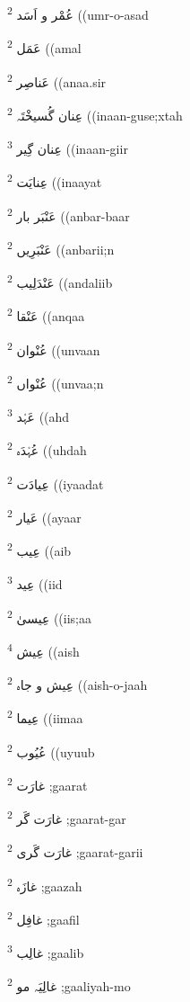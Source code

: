 \documentclass[12pt]{article}
\begin{document}
\begin{multicols}{5}
{\ur عُمْر و اَسَد}   \textsuperscript{2} ((umr-o-asad

{\ur عَمَل}   \textsuperscript{2} ((amal

{\ur عَناصِر}   \textsuperscript{2} ((anaa.sir

{\ur عِنان گُسیخْتَہ}   \textsuperscript{2} ((inaan-guse;xtah

{\ur عِنان گِیر}   \textsuperscript{3} ((inaan-giir

{\ur عِنایَت}   \textsuperscript{2} ((inaayat

{\ur عَنْبَر بار}   \textsuperscript{2} ((anbar-baar

{\ur عَنْبَرِیں}   \textsuperscript{2} ((anbarii;n

{\ur عَنْدَلِیب}   \textsuperscript{2} ((andaliib

{\ur عَنْقا}   \textsuperscript{2} ((anqaa

{\ur عُنْوان}   \textsuperscript{2} ((unvaan

{\ur عُنْواں}   \textsuperscript{2} ((unvaa;n

{\ur عَہْد}   \textsuperscript{3} ((ahd

{\ur عُہْدَہ}   \textsuperscript{2} ((uhdah

{\ur عِیادَت}   \textsuperscript{2} ((iyaadat

{\ur عَیار}   \textsuperscript{2} ((ayaar

{\ur عِیب}   \textsuperscript{2} ((aib

{\ur عِید}   \textsuperscript{3} ((iid

{\ur عِیسیٰ}   \textsuperscript{2} ((iis;aa

{\ur عِیش}   \textsuperscript{4} ((aish

{\ur عِیش و جاہ}   \textsuperscript{2} ((aish-o-jaah

{\ur عِیما}   \textsuperscript{2} ((iimaa

{\ur عُیُوب}   \textsuperscript{2} ((uyuub

{\ur غارَت}   \textsuperscript{2} ;gaarat

{\ur غارَت گَر}   \textsuperscript{2} ;gaarat-gar

{\ur غارَت گَری}   \textsuperscript{2} ;gaarat-garii

{\ur غازَہ}   \textsuperscript{2} ;gaazah

{\ur غافِل}   \textsuperscript{2} ;gaafil

{\ur غالِب}   \textsuperscript{3} ;gaalib

{\ur غالِیَہ مو}   \textsuperscript{2} ;gaaliyah-mo


\end{multicols}
\end{document}
